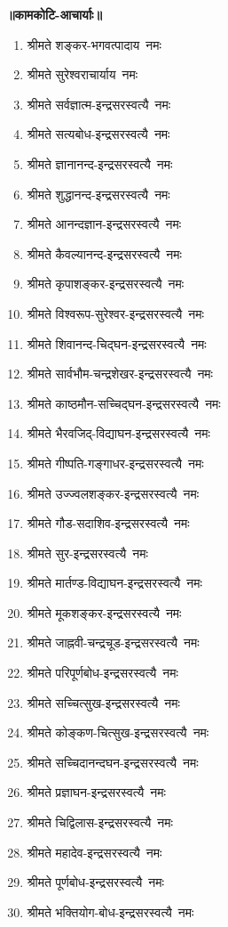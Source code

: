 \begin{center}
\begin{flushleft}
\centerline{\bfseries ॥कामकोटि-आचार्याः॥}
\begin{enumerate}
\item श्रीमते शङ्कर-भगवत्पादाय~नमः
\item श्रीमते सुरेश्वराचार्याय~नमः
\item श्रीमते सर्वज्ञात्म-इन्द्रसरस्वत्यै~नमः
\item श्रीमते सत्यबोध-इन्द्रसरस्वत्यै~नमः
\item श्रीमते ज्ञानानन्द-इन्द्रसरस्वत्यै~नमः
\item श्रीमते शुद्धानन्द-इन्द्रसरस्वत्यै~नमः
\item श्रीमते आनन्दज्ञान-इन्द्रसरस्वत्यै~नमः
\item श्रीमते कैवल्यानन्द-इन्द्रसरस्वत्यै~नमः
\item श्रीमते कृपाशङ्कर-इन्द्रसरस्वत्यै~नमः
\item श्रीमते विश्वरूप-सुरेश्वर-इन्द्रसरस्वत्यै~नमः
\item श्रीमते शिवानन्द-चिद्घन-इन्द्रसरस्वत्यै~नमः
\item श्रीमते सार्वभौम-चन्द्रशेखर-इन्द्रसरस्वत्यै~नमः
\item श्रीमते काष्ठमौन-सच्चिद्घन-इन्द्रसरस्वत्यै~नमः
\item श्रीमते भैरवजिद्-विद्याघन-इन्द्रसरस्वत्यै~नमः
\item श्रीमते गीष्पति-गङ्गाधर-इन्द्रसरस्वत्यै~नमः
\item श्रीमते उज्ज्वलशङ्कर-इन्द्रसरस्वत्यै~नमः
\item श्रीमते गौड-सदाशिव-इन्द्रसरस्वत्यै~नमः
\item श्रीमते सुर-इन्द्रसरस्वत्यै~नमः
\item श्रीमते मार्तण्ड-विद्याघन-इन्द्रसरस्वत्यै~नमः
\item श्रीमते मूकशङ्कर-इन्द्रसरस्वत्यै~नमः
\item श्रीमते जाह्नवी-चन्द्रचूड-इन्द्रसरस्वत्यै~नमः
\item श्रीमते परिपूर्णबोध-इन्द्रसरस्वत्यै~नमः
\item श्रीमते सच्चित्सुख-इन्द्रसरस्वत्यै~नमः
\item श्रीमते कोङ्कण-चित्सुख-इन्द्रसरस्वत्यै~नमः
\item श्रीमते सच्चिदानन्दघन-इन्द्रसरस्वत्यै~नमः
\item श्रीमते प्रज्ञाघन-इन्द्रसरस्वत्यै~नमः
\item श्रीमते चिद्विलास-इन्द्रसरस्वत्यै~नमः
\item श्रीमते महादेव-इन्द्रसरस्वत्यै~नमः
\item श्रीमते पूर्णबोध-इन्द्रसरस्वत्यै~नमः
\item श्रीमते भक्तियोग-बोध-इन्द्रसरस्वत्यै~नमः

\end{enumerate}
\end{flushleft}
\end{center}
